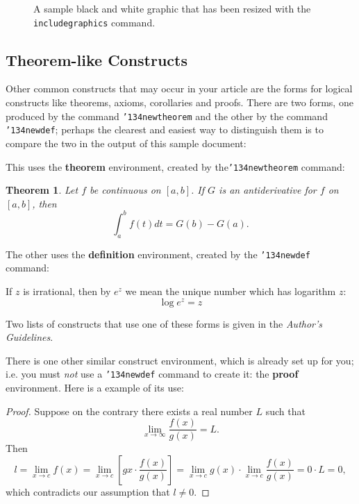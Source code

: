 \documentclass{sig-alternate-05-2015}
\begin{document}
\begin{figure}
\centering
\caption{A sample black and white graphic that has
been resized with the \texttt{includegraphics} command.}
\vskip -6pt
\end{figure}

\subsection{Theorem-like Constructs}
Other common constructs that may occur in your article are
the forms for logical constructs like theorems, axioms,
corollaries and proofs.  There are
two forms, one produced by the
command \texttt{{\char'134}newtheorem} and the
other by the command \texttt{{\char'134}newdef}; perhaps
the clearest and easiest way to distinguish them is
to compare the two in the output of this sample document:

This uses the \textbf{theorem} environment, created by
the\linebreak\texttt{{\char'134}newtheorem} command:
\newtheorem{theorem}{Theorem}
\begin{theorem}
Let $f$ be continuous on $[a,b]$.  If $G$ is
an antiderivative for $f$ on $[a,b]$, then
\begin{displaymath}\int^b_af(t)dt = G(b) - G(a).\end{displaymath}
\end{theorem}

The other uses the \textbf{definition} environment, created
by the \texttt{{\char'134}newdef} command:
\begin{definition}
If $z$ is irrational, then by $e^z$ we mean the
unique number which has
logarithm $z$: \begin{displaymath}{\log e^z = z}\end{displaymath}
\end{definition}

Two lists of constructs that use one of these
forms is given in the
\textit{Author's  Guidelines}.
 
There is one other similar construct environment, which is
already set up
for you; i.e. you must \textit{not} use
a \texttt{{\char'134}newdef} command to
create it: the \textbf{proof} environment.  Here
is a example of its use:
\begin{proof}
Suppose on the contrary there exists a real number $L$ such that
\begin{displaymath}
\lim_{x\rightarrow\infty} \frac{f(x)}{g(x)} = L.
\end{displaymath}
Then
\begin{displaymath}
l=\lim_{x\rightarrow c} f(x)
= \lim_{x\rightarrow c}
\left[ g{x} \cdot \frac{f(x)}{g(x)} \right ]
= \lim_{x\rightarrow c} g(x) \cdot \lim_{x\rightarrow c}
\frac{f(x)}{g(x)} = 0\cdot L = 0,
\end{displaymath}
which contradicts our assumption that $l\neq 0$.
\end{proof}
\end{document}
